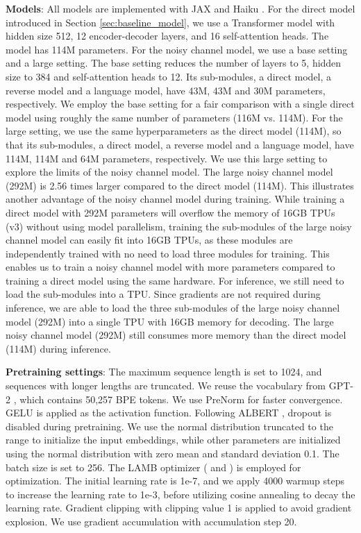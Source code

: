 \documentclass[11pt,a4paper]{article}
\begin{document}
\textbf{Models}: All models are implemented with JAX \cite{jax2018github} and Haiku \cite{haiku2020github}. For the direct model introduced in Section \ref{sec:baseline_model}, we use a Transformer model with hidden size 512, 12 encoder-decoder layers, and 16 self-attention heads. The model has 114M parameters. For the noisy channel model, we use a base setting and a large setting. The base setting reduces the number of layers to 5, hidden size to 384 and self-attention heads to 12. Its sub-modules, a direct model, a reverse model and a language model, have 43M, 43M and 30M parameters, respectively. We employ the base setting for a fair comparison with a single direct model using roughly the same number of parameters (116M vs. 114M). For the large setting, we use the same hyperparameters as the direct model (114M), so that its sub-modules, a direct model, a reverse model and a language model, have 114M, 114M and 64M parameters, respectively. We use this large setting to explore the limits of the noisy channel model. The large noisy channel model (292M) is 2.56 times larger compared to the direct model (114M). This illustrates another advantage of the noisy channel model during training. While training a direct model with 292M parameters will overflow the memory of 16GB TPUs (v3) without using model parallelism, training the sub-modules of the large noisy channel model can easily fit into 16GB TPUs, as these modules are independently trained with no need to load three modules for training. This enables us to train a noisy channel model with more parameters compared to training a direct model using the same hardware. For inference, we still need to load the sub-modules into a TPU. Since gradients are not required during inference, we are able to load the three sub-modules of the large noisy channel model (292M) into a single TPU with 16GB memory for decoding. The large noisy channel model (292M) still consumes more memory than the direct model (114M) during inference.

\textbf{Pretraining settings}: The maximum sequence length  is set to 1024, and sequences with longer lengths are truncated. We reuse the vocabulary from GPT-2 \cite{radford2019language}, which contains 50,257 BPE tokens. We use PreNorm \cite{nguyen2019transformers} for faster convergence. GELU \cite{hendrycks2016gaussian} is applied as the activation function. Following ALBERT \cite{lan2019albert}, dropout is disabled during pretraining. We use the normal distribution truncated to the range  to initialize the input embeddings, while other parameters are initialized using the normal distribution with zero mean and standard deviation 0.1. The batch size is set to 256. The LAMB optimizer \cite{you2019large} ( and ) is employed for optimization. The initial learning rate is 1e-7, and we apply 4000 warmup steps to increase the learning rate to 1e-3, before utilizing cosine annealing to decay the learning rate. Gradient clipping with clipping value 1 is applied to avoid gradient explosion. We use gradient accumulation with accumulation step 20. 
\end{document}

